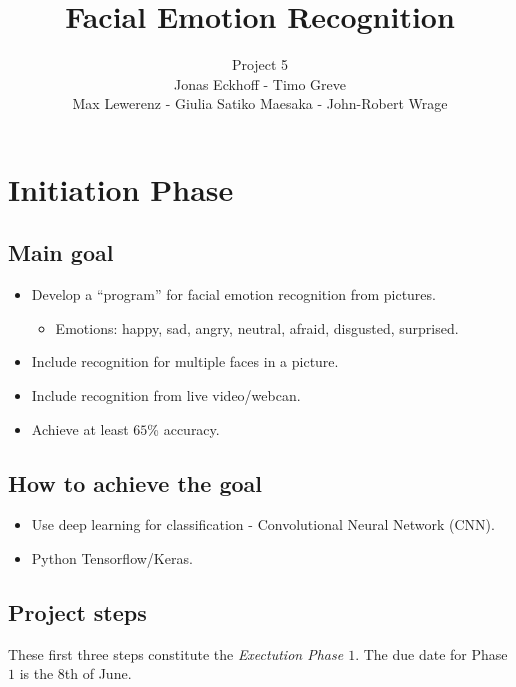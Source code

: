 \documentclass[]{article}
\begin{document}
\author{Project 5\\
Jonas Eckhoff - Timo Greve\\ 
Max Lewerenz - Giulia Satiko Maesaka - John-Robert Wrage}
\title{Facial Emotion Recognition}
\maketitle{}

\section{Initiation Phase}
\subsection{Main goal}
\begin{itemize}
\item Develop a ``program'' for facial emotion recognition from pictures.
    \begin{itemize}
    \item Emotions: happy, sad, angry, neutral, afraid, disgusted, surprised. 
    \end{itemize}
\item Include recognition for multiple faces in a picture.
\item Include recognition from live video/webcan.
\item Achieve at least $65$\% accuracy.
\end{itemize}


\subsection{How to achieve the goal}
\begin{itemize}
\item Use deep learning for classification - Convolutional Neural Network (CNN).
\item Python Tensorflow/Keras.
\end{itemize}

\subsection{Project steps}

These first three steps constitute the \textit{Exectution Phase $1$}. The due date for Phase $1$ is the 8th of June.
\end{document}
